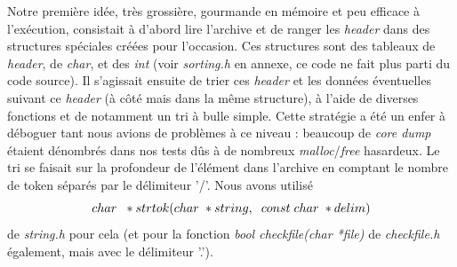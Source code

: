 \documentclass[12pt, a4paper]{report}
\begin{document}
\hspace{0.5cm}Notre première idée, très grossière, gourmande en mémoire et peu efficace à l'exécution, consistait à d'abord lire l'archive et de ranger les \textit{header} dans des structures spéciales créées pour l'occasion. Ces structures sont des tableaux de \textit{header}, de \textit{char}, et des \textit{int} (voir \textit{sorting.h} en annexe, ce code ne fait plus parti du code source). Il s'agissait ensuite de trier ces \textit{header} et les données éventuelles suivant ce \textit{header} (à côté mais dans la même structure), à l'aide de diverses fonctions et de notamment un tri à bulle simple. Cette stratégie a été un enfer à déboguer tant nous avions de problèmes à ce niveau : beaucoup de \textit{core dump} étaient dénombrés dans nos tests dûs à de nombreux \textit{malloc}/\textit{free} hasardeux. Le tri se faisait sur la profondeur de l'élément dans l'archive en comptant le nombre de token séparés par le délimiteur '/'. Nous avons utilisé \[char\hspace{0.2cm}*strtok(char\hspace{0.1cm}*string,\hspace{0.2cm}const\hspace{0.1cm}char\hspace{0.1cm}*delim)\] de \textit{string.h} pour cela (et pour la fonction \textit{bool checkfile(char *file)} de \textit{checkfile.h} également, mais avec le délimiteur '.').\\
\end{document}
